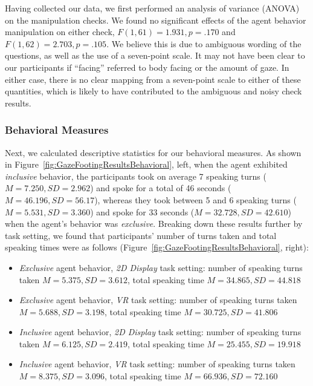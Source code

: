 Having collected our data, we first performed an analysis of variance (ANOVA) on the manipulation checks. We found no significant effects of the agent behavior manipulation on either check, $F(1, 61) = 1.931, p = .170$ and $F(1, 62) = 2.703, p = .105$. We believe this is due to ambiguous wording of the questions, as well as the use of a seven-point scale. It may not have been clear to our participants if ``facing'' referred to body facing or the amount of gaze. In either case, there is no clear mapping from a seven-point scale to either of these quantities, which is likely to have contributed to the ambiguous and noisy check results.

\subsubsection{Behavioral Measures}

Next, we calculated descriptive statistics for our behavioral measures. As shown in Figure~\ref{fig:GazeFootingResultsBehavioral}, left, when the agent exhibited \emph{inclusive} behavior, the participants took on average 7 speaking turns ($M = 7.250, SD = 2.962$) and spoke for a total of 46 seconds ($M = 46.196, SD = 56.17$), whereas they took between 5 and 6 speaking turns ($M = 5.531, SD = 3.360$) and spoke for 33 seconds ($M = 32.728, SD = 42.610$) when the agent's behavior was \emph{exclusive}. Breaking down these results further by task setting, we found that participants' number of turns taken and total speaking times were as follows (Figure~\ref{fig:GazeFootingResultsBehavioral}, right):

\begin{itemize}
\item \emph{Exclusive} agent behavior, \emph{2D Display} task setting: number of speaking turns taken $M = 5.375, SD = 3.612$, total speaking time $M = 34.865, SD = 44.818$
\item \emph{Exclusive} agent behavior, \emph{VR} task setting: number of speaking turns taken $M = 5.688, SD = 3.198$, total speaking time $M = 30.725, SD = 41.806$
\item \emph{Inclusive} agent behavior, \emph{2D Display} task setting: number of speaking turns taken $M = 6.125, SD = 2.419$, total speaking time $M = 25.455, SD = 19.918$
\item \emph{Inclusive} agent behavior, \emph{VR} task setting: number of speaking turns taken $M = 8.375, SD = 3.096$, total speaking time $M = 66.936, SD = 72.160$
\end{itemize}

